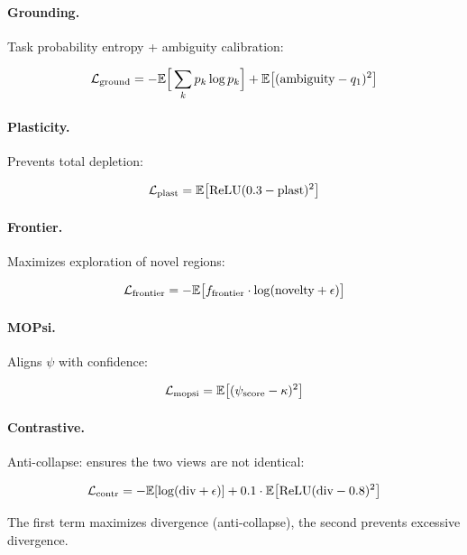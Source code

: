 \paragraph{Grounding.}
Task probability entropy + ambiguity calibration:

\begin{equation}
    \mathcal{L}_{\text{ground}} = -\mathbb{E}\Big[\sum_k p_k \log p_k\Big] + \mathbb{E}\big[(\text{ambiguity} - q_1)^2\big]
\end{equation}

\paragraph{Plasticity.}
Prevents total depletion:

\begin{equation}
    \mathcal{L}_{\text{plast}} = \mathbb{E}\big[\text{ReLU}(0.3 - \text{plast})^2\big]
\end{equation}

\paragraph{Frontier.}
Maximizes exploration of novel regions:

\begin{equation}
    \mathcal{L}_{\text{frontier}} = -\mathbb{E}\big[f_{\text{frontier}} \cdot \log(\text{novelty} + \epsilon)\big]
\end{equation}

\paragraph{MOPsi.}
Aligns $\psi$ with confidence:

\begin{equation}
    \mathcal{L}_{\text{mopsi}} = \mathbb{E}\big[(\psi_{\text{score}} - \kappa)^2\big]
\end{equation}

\paragraph{Contrastive.}
Anti-collapse: ensures the two views are not identical:

\begin{equation}
    \mathcal{L}_{\text{contr}} = -\mathbb{E}[\log(\text{div} + \epsilon)] + 0.1 \cdot \mathbb{E}\big[\text{ReLU}(\text{div} - 0.8)^2\big]
\end{equation}

The first term maximizes divergence (anti-collapse), the second prevents
excessive divergence.

